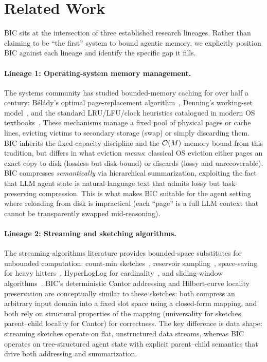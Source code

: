
\section{Related Work}
\label{sec:related}

BIC sits at the intersection of three established research lineages.
Rather than claiming to be ``the first'' system to bound agentic
memory, we explicitly position BIC against each lineage and identify
the specific gap it fills.

\paragraph{Lineage 1: Operating-system memory management.}
The systems community has studied bounded-memory caching for over
half a century: B{\'e}l{\'a}dy's optimal page-replacement
algorithm~\citep{belady1966study}, Denning's working-set
model~\citep{denning1970wset}, and the standard LRU/LFU/clock
heuristics catalogued in modern OS
textbooks~\citep{tanenbaum2014modern}.  These mechanisms manage a
fixed pool of physical pages or cache lines, evicting victims to
secondary storage (swap) or simply discarding them.  BIC inherits the
fixed-capacity discipline and the $\mathcal{O}(M)$ memory bound from this
tradition, but differs in what eviction \emph{means}: classical OS
eviction either pages an exact copy to disk (lossless but
disk-bound) or discards (lossy and unrecoverable).  BIC compresses
\emph{semantically} via hierarchical summarization, exploiting the
fact that LLM agent state is natural-language text that admits lossy
but task-preserving compression.  This is what makes BIC suitable for
the agent setting where reloading from disk is impractical (each
``page'' is a full LLM context that cannot be transparently swapped
mid-reasoning).

\paragraph{Lineage 2: Streaming and sketching algorithms.}
The streaming-algorithms literature provides bounded-space
substitutes for unbounded computation: count-min
sketches~\citep{cormode2005cm}, reservoir
sampling~\citep{vitter1985reservoir}, space-saving for heavy
hitters~\citep{metwally2005spacesaving}, HyperLogLog for
cardinality~\citep{flajolet2007hyperloglog}, and sliding-window
algorithms~\citep{datar2002sliding}.  BIC's deterministic Cantor
addressing and Hilbert-curve locality preservation are conceptually
similar to these sketches: both compress an arbitrary input domain
into a fixed slot space using a closed-form mapping, and both rely
on structural properties of the mapping (universality for sketches,
parent--child locality for Cantor) for correctness.  The key
difference is data shape: streaming sketches operate on flat,
unstructured data streams, whereas BIC operates on tree-structured
agent state with explicit parent--child semantics that drive both
addressing and summarization.

